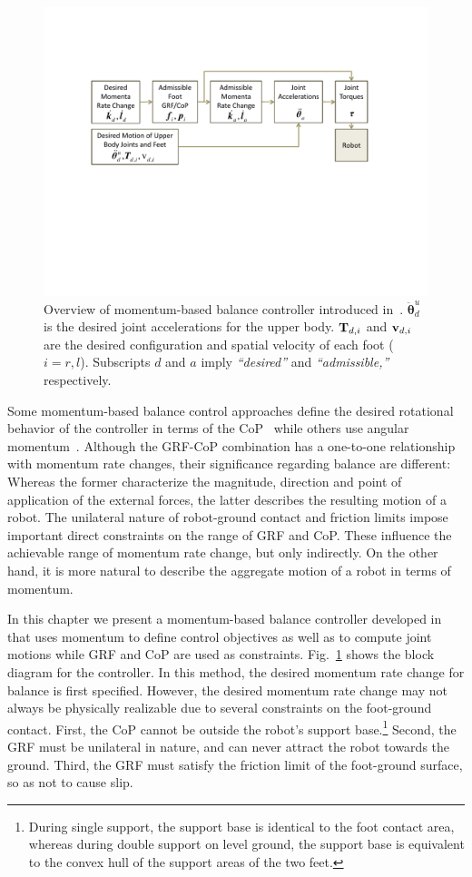 \documentclass{llncs}
\newcommand {\mat}[1] {{\bf #1}}
\newcommand{\mT} {\mat{T}}
\newcommand{\vddth} {\boldsymbol{\ddot{\theta}}}
\newcommand{\sv} {{\bf v}} %
\begin{document}
\begin{figure}[h]
\begin{center}
\includegraphics[width = 0.7\columnwidth]{Figures/diagram-short.pdf}
\end{center}
\caption{Overview of momentum-based balance controller introduced in~\cite{LG12}.
$\vddth_d^u$ is the desired joint accelerations for the upper body.
$\mT_{d,i}$ and $\sv_{d,i}$ are the desired configuration
and spatial velocity of each foot ($i = r, l$). Subscripts $d$ and $a$ imply {\em ``desired''} and {\em ``admissible,''} respectively. }
\label{fig:overview}
\end{figure}


Some momentum-based balance control approaches define the desired rotational
behavior of the controller in terms of the CoP~\cite{AG05,Macchietto09}
while others use angular momentum~\cite{KKKFHYH03}.
Although the GRF-CoP combination has a one-to-one relationship
with momentum rate changes, their significance regarding
balance are different: Whereas the former characterize the magnitude, direction and
point of application of
the external forces, the latter describes the resulting motion of a robot.
The unilateral nature of robot-ground contact and friction limits
impose important direct constraints on the range of GRF and CoP.
 These influence the achievable range of momentum rate change,
 but only indirectly. On the other hand, it is more natural to describe
the aggregate motion of a robot in terms of momentum.


In this chapter we present a momentum-based balance controller developed in~\cite{LG12}
that uses momentum to define control objectives as well as to compute joint motions
while GRF and CoP are used as constraints.
Fig.~\ref{fig:overview} shows the block diagram for the controller.
In this method, the desired momentum rate change for balance is first specified.
However, the desired momentum rate change may not always be physically
realizable due to several constraints on the foot-ground
contact. First, the CoP cannot be outside the
robot's support base.\footnote{ During single support, the support base is identical to
the foot contact area, whereas during double support on level ground,
the support base is equivalent to the
convex hull of the support areas of the two feet.}
Second, the GRF must be unilateral in nature, and can never attract the
robot towards the ground. Third, the GRF must satisfy the friction
limit of the foot-ground surface, so as not to cause slip.
\end{document}
